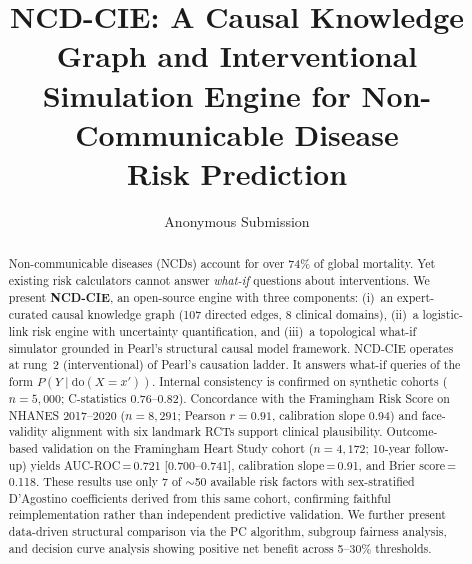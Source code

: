\documentclass[runningheads]{llncs}
\begin{document}
\title{NCD-CIE: A Causal Knowledge Graph and Interventional\\Simulation Engine for Non-Communicable Disease\\Risk Prediction}

\author{Anonymous Submission}

\maketitle

\begin{abstract}
Non-communicable diseases (NCDs) account for over 74\% of global
mortality.
Yet existing risk calculators cannot answer \emph{what-if} questions
about interventions.
We present \textbf{NCD-CIE}, an open-source engine with three
components:
(i)~an expert-curated causal knowledge graph (107 directed edges,
8 clinical domains),
(ii)~a logistic-link risk engine with uncertainty quantification, and
(iii)~a topological what-if simulator grounded in Pearl's structural
causal model framework.
NCD-CIE operates at rung~2 (interventional) of Pearl's causation
ladder.
It answers what-if queries of the form
$P(Y \mid \mathrm{do}(X\!=\!x'))$.
Internal consistency is confirmed on synthetic cohorts
($n\!=\!5{,}000$; C-statistics 0.76--0.82).
Concordance with the Framingham Risk Score on NHANES 2017--2020
($n\!=\!8{,}291$; Pearson $r\!=\!0.91$, calibration slope 0.94)
and face-validity alignment with six landmark RCTs support clinical
plausibility.
Outcome-based validation on the Framingham Heart Study cohort
($n\!=\!4{,}172$; 10-year follow-up) yields
AUC-ROC\,=\,0.721 [0.700--0.741],
calibration slope\,=\,0.91, and Brier score\,=\,0.118.
These results use only 7 of ${\sim}$50 available risk factors
with sex-stratified D'Agostino coefficients derived from this same
cohort, confirming faithful reimplementation rather than independent
predictive validation.
We further present data-driven structural comparison
via the PC algorithm, subgroup fairness analysis, and decision curve
analysis showing positive net benefit across 5--30\% thresholds.

\end{abstract}

\end{document}
